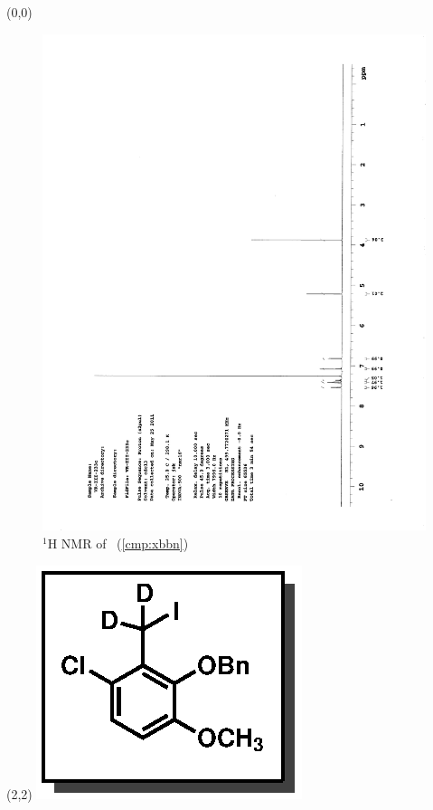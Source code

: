 \begin{textblock}{20}(0,0)
\begin{figure}[htb]
\caption{$^1$H NMR of \CMPxbbn\ (\ref{cmp:xbbn})}
\includegraphics[scale=0.75, trim = 0mm 0mm 0mm 5mm,
clip]{chp_singlecarbon/images/nmr/xbbnH}
\vspace{-100pt}
\end{figure}
\end{textblock}
\begin{textblock}{1}(2,2)
\includegraphics[scale=0.8, angle=90]{chp_singlecarbon/images/xbbn}
\end{textblock}
